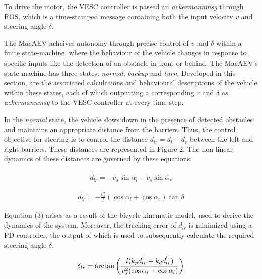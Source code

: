 \documentclass[conference]{IEEEtran}
\begin{document}
To drive the motor, the VESC controller is passed an \textit{ackermann\textunderscore msg} through ROS, which is a time-stamped message containing both the input velocity $v$ and steering angle $\delta$. 


The MacAEV acheives autonomy through precise control of $v$ and $\delta$ within a finite state-machine, where the behaviour of the vehicle changes in response to specific inputs like the detection of an obstacle in-front or behind. The MacAEV's state machine has three states: \textit{normal}, \textit{backup} and \textit{turn}. Developed in this section, are the associated calculations and behavioural descriptions of the vehicle within these states, each of which outputting a corresponding $v$ and $\delta$ as \textit{ackermann\textunderscore msg} to the VESC controller at every time step.  


In the \textit{normal} state, the vehicle slows down in the presence of detected obstacles and maintains an appropriate distance from the barriers. Thus, the control objective for steering is to control the distance $d_{lr} = d_l - d_r$ between the left and right barriers. These distances are represented in Figure 2. The non-linear dynamics of these distances are governed by these equations:


\begin{equation}
    \begin{aligned}
        \dot{d_{lr}} = -v_s \sin \alpha_l - v_s \sin \alpha_r
    \end{aligned}
\end{equation}  

\begin{equation}
    \begin{aligned}
        \ddot{d_{lr}} = -\frac{v_s^2}{l} (\cos \alpha_l + \cos \alpha_r)\tan \delta 
    \end{aligned}
\end{equation}

Equation (3) arises as a result of the bicycle kinematic model, used to derive the dynamics of the system. Moreover, the tracking error of $d_{lr}$ is minimized using a PD controller, the output of which is used to subsequently calculate the required steering angle $\delta$. 

\begin{equation}
        \delta_{lr} = \arctan \left( \frac{l ( k_p \Tilde{d_{lr}} +k_d \dot{d_{lr}} )}{v_s^2(\cos \alpha_{r} + \cos \alpha_{l} )} \right) 
\end{equation}
\end{document}
